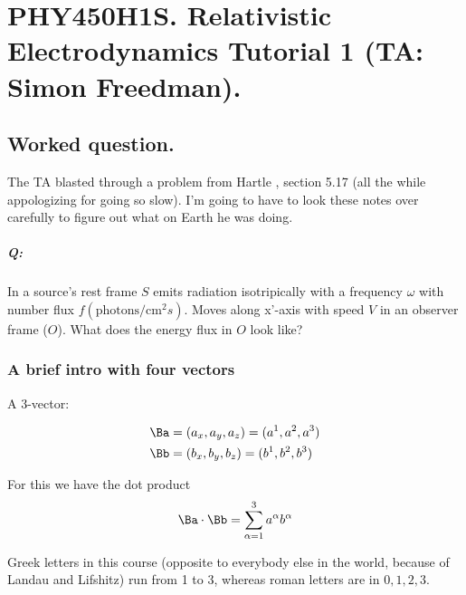 
%

\chapter{PHY450H1S.  Relativistic Electrodynamics Tutorial 1 (TA: Simon Freedman).}
\label{chap:relativisticElectrodynamicsT1}
{}
\date{Jan 20, 2011}

\beginArtNoToc

\section{Worked question.}

The TA blasted through a problem from Hartle \cite{hartle2003gravity}, section 5.17 (all the while appologizing for going so slow).  I'm going to have to look these notes over carefully to figure out what on Earth he was doing.

\paragraph{Q:}
In a source's rest frame $S$ emits radiation isotripically with a frequency $\omega$ with number flux $f(\text{photons}/\text{cm}^2 s)$.  Moves along x'-axis with speed $V$ in an observer frame ($O$).  What does the energy flux in $O$ look like?

\subsection{A brief intro with four vectors}

A 3-vector: 

\begin{align}\label{eqn:relativisticElectrodynamicsT1:10}
\Ba &= (a_x, a_y, a_z) = (a^1, a^2, a^3) \\
\Bb &= (b_x, b_y, b_z) = (b^1, b^2, b^3)
\end{align}

For this we have the dot product
\begin{equation}\label{eqn:relativisticElectrodynamicsT1:20}
\Ba \cdot \Bb = \sum_{\alpha=1}^3 a^\alpha b^\alpha
\end{equation}

Greek letters in this course (opposite to everybody else in the world, because of Landau and Lifshitz) run from 1 to 3, whereas roman letters are in $0,1,2,3$.

